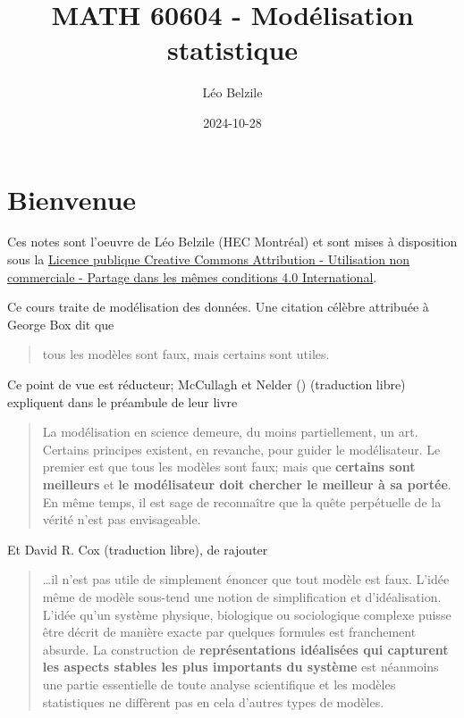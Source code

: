 \documentclass[
  11pt,
  letterpaper,
]{scrbook}
\title{MATH 60604 - Modélisation statistique}
\author{Léo Belzile}
\date{2024-10-28}
\renewcommand*\contentsname{Table des matières}
\newcommand\contentsname{Table des matières}
\theoremstyle{definition}
\theoremstyle{plain}
\theoremstyle{definition}
\theoremstyle{plain}
\theoremstyle{remark}
\begin{document}


\renewcommand*\contentsname{Table des matières}
{
\setcounter{tocdepth}{2}
\tableofcontents
}

\mainmatter
{}

\chapter*{Bienvenue}\label{bienvenue}


Ces notes sont l'oeuvre de Léo Belzile (HEC Montréal) et sont mises à
disposition sous la
\href{https://creativecommons.org/licenses/by-nc-sa/4.0/legalcode.fr}{Licence
publique Creative Commons Attribution - Utilisation non commerciale -
Partage dans les mêmes conditions 4.0 International}.

Ce cours traite de modélisation des données. Une citation célèbre
attribuée à George Box dit que

\begin{quote}
tous les modèles sont faux, mais certains sont utiles.
\end{quote}

Ce point de vue est réducteur; McCullagh et Nelder
() (traduction libre)
expliquent dans le préambule de leur livre

\begin{quote}
La modélisation en science demeure, du moins partiellement, un art.
Certains principes existent, en revanche, pour guider le modélisateur.
Le premier est que tous les modèles sont faux; mais que \textbf{certains
sont meilleurs} et \textbf{le modélisateur doit chercher le meilleur à
sa portée}. En même temps, il est sage de reconnaître que la quête
perpétuelle de la vérité n'est pas envisageable.
\end{quote}

Et David R. Cox (traduction libre), de rajouter

\begin{quote}
\ldots il n'est pas utile de simplement énoncer que tout modèle est
faux. L'idée même de modèle sous-tend une notion de simplification et
d'idéalisation. L'idée qu'un système physique, biologique ou
sociologique complexe puisse être décrit de manière exacte par quelques
formules est franchement absurde. La construction de
\textbf{représentations idéalisées qui capturent les aspects stables les
plus importants du système} est néanmoins une partie essentielle de
toute analyse scientifique et les modèles statistiques ne diffèrent pas
en cela d'autres types de modèles.
\end{quote}
\end{document}
